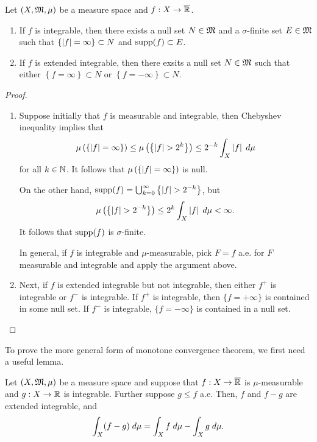 \documentclass[a4paper]{article}
\begin{document}
\begin{cor}
Let $(X, \mathfrak{M}, \mu)$ be a measure space and $f: X \to \overline{\mathbb{R}}$.
\begin{enumerate}
  \item If $f$ is integrable, then there exists 
  a null set $N \in \mathfrak{M}$ and a $\sigma$-finite set $E \in \mathfrak{M}$
  such that 
  $\left\{ \left\lvert f\right\rvert = \infty \right\} \subset N$ 
  and $\operatorname{supp}(f) \subset E$.

  \item If $f$ is extended integrable, then there 
  exsits a null set $N \in \mathfrak{M}$ such that 
  either $\left\{ f = \infty \right\} \subset N$
  or $\left\{ f = -\infty \right\} \subset N$.
\end{enumerate}
\end{cor}

\begin{proof}
\begin{enumerate}
  \item Suppose initially that $f$ is measurable and integrable, 
  then Chebyshev inequality implies that 
  \[
  \mu \left( \left\{ \left\lvert f\right\rvert = \infty \right\} \right) 
  \leq \mu \left( \left\{ \left\lvert f\right\rvert > 2^k \right\} \right) 
  \leq 2^{-k} \int_X \left\lvert f\right\rvert \; d \mu
  \]
  for all $k \in \mathbb{N}$. It follows that 
  $\mu \left( \left\{ \left\lvert f\right\rvert = \infty \right\} \right)$ 
  is null. 
  
  On the other hand, $\operatorname{supp}(f) = \bigcup_{k=0}^\infty \left\{ \left\lvert f\right\rvert 
  > 2^{-k} \right\}$, but 
  \[
  \mu \left( \left\{ \left\lvert f\right\rvert > 2^{-k} \right\} \right) 
  \leq 2^k \int_X \left\lvert f\right\rvert \; d \mu < \infty.
  \]
  It follows that $\operatorname{supp}(f)$ is $\sigma$-finite. 
  
  In general, if $f$ is integrable and $\mu$-measurable, 
  pick $F = f$ a.e. for $F$ measurable and integrable and 
  apply the argument above.

  \item Next, if $f$ is extended integrable but not integrable, 
  then either $f^+$ is integrable or $f^-$ is integrable.
  If $f^+$ is integrable, then $\{f = +\infty\}$ is 
  contained in some null set. If $f^-$ is integrable, 
  $\{f = -\infty\}$ is contained in a null set.
\end{enumerate}
\end{proof}

To prove the more general form of monotone convergence theorem,
we first need a useful lemma. 

\begin{lemma}
Let $(X, \mathfrak{M}, \mu)$ be a measure space and suppose that 
$f : X \to \overline{\mathbb{R}}$ is $\mu$-measurable and $g : X \to \mathbb{R}$
is integrable. Further suppose $g \leq f$ a.e. Then, $f$ 
and $f - g$ are extended integrable, and 
\[
\int_X (f - g) \; d \mu = \int_X f \; d \mu - \int_X g \; d \mu.
\]
\end{lemma}
\end{document}

